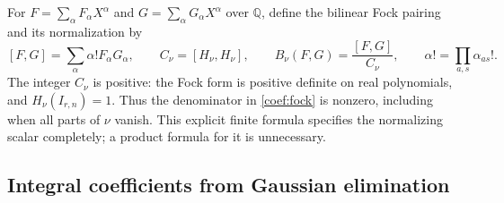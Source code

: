 For $F=\sum_\alpha F_\alpha X^\alpha$ and
$G=\sum_\alpha G_\alpha X^\alpha$ over $\mathbb Q$, define the
bilinear Fock pairing and its normalization by
\begin{equation}\label{coef:fock}
 [F,G]=\sum_\alpha\alpha!F_\alpha G_\alpha,
 \qquad C_\nu=[H_\nu,H_\nu],\qquad
 B_\nu(F,G)=\frac{[F,G]}{C_\nu},
 \qquad \alpha!=\prod_{a,s}\alpha_{as}!.
\end{equation}
The integer $C_\nu$ is positive: the Fock form is positive definite
on real polynomials, and $H_\nu(I_{r,n})=1$.
Thus the denominator in \eqref{coef:fock} is nonzero, including when
all parts of $\nu$ vanish. This explicit finite formula specifies the
normalizing scalar completely; a product formula for it is unnecessary.

\subsection{Integral coefficients from Gaussian elimination}

